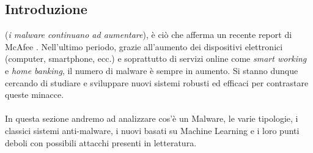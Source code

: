 \subsection{Introduzione}
 (\textit{i malware continuano ad aumentare}), è ciò che afferma un recente report di McAfee \cite{malware}. Nell'ultimo periodo, grazie all'aumento dei dispositivi elettronici (computer, smartphone, ecc.) e soprattutto di servizi online come \textit{smart working} e \textit{home banking}, il numero di malware è sempre in aumento. Si stanno dunque cercando di studiare e sviluppare nuovi sistemi robusti ed efficaci per contrastare queste minacce.\\
\\
In questa sezione andremo ad analizzare cos'è un Malware, le varie tipologie, i classici sistemi anti-malware, i nuovi basati su Machine Learning e i loro punti deboli con possibili attacchi presenti in letteratura.
